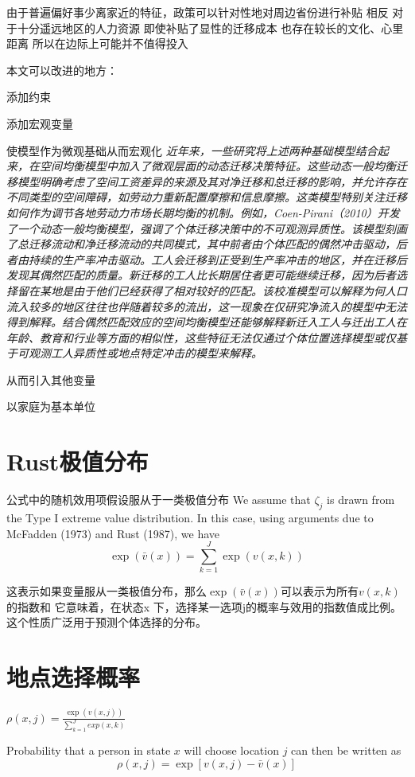 \documentclass[a4paper,12pt]{article}
\begin{document}
由于普遍偏好事少离家近的特征，政策可以针对性地对周边省份进行补贴
相反 对于十分遥远地区的人力资源 即使补贴了显性的迁移成本 也存在较长的文化、心里距离 所以在边际上可能并不值得投入



本文可以改进的地方：

添加约束

添加宏观变量

使模型作为微观基础从而宏观化
\textit{近年来，一些研究将上述两种基础模型结合起来，在空间均衡模型中加入了微观层面的动态迁移决策特征。这些动态一般均衡迁移模型明确考虑了空间工资差异的来源及其对净迁移和总迁移的影响，并允许存在不同类型的空间障碍，如劳动力重新配置摩擦和信息摩擦。这类模型特别关注迁移如何作为调节各地劳动力市场长期均衡的机制。例如，Coen-Pirani（2010）开发了一个动态一般均衡模型，强调了个体迁移决策中的不可观测异质性。该模型刻画了总迁移流动和净迁移流动的共同模式，其中前者由个体匹配的偶然冲击驱动，后者由持续的生产率冲击驱动。工人会迁移到正受到生产率冲击的地区，并在迁移后发现其偶然匹配的质量。新迁移的工人比长期居住者更可能继续迁移，因为后者选择留在某地是由于他们已经获得了相对较好的匹配。该校准模型可以解释为何人口流入较多的地区往往也伴随着较多的流出，这一现象在仅研究净流入的模型中无法得到解释。结合偶然匹配效应的空间均衡模型还能够解释新迁入工人与迁出工人在年龄、教育和行业等方面的相似性，这些特征无法仅通过个体位置选择模型或仅基于可观测工人异质性或地点特定冲击的模型来解释。}

从而引入其他变量

以家庭为基本单位


\newpage
\appendix
\section{Rust极值分布}
公式中的随机效用项假设服从于一类极值分布
We assume that $\zeta_j$ is drawn from the Type I extreme value distribution. In this case, using arguments due to McFadden (1973) and Rust (1987), we have
$$\exp\left(\bar{v}(x)\right) = \sum_{k=1}^J \exp\left(v(x, k)\right)$$

这表示如果变量服从一类极值分布，那么$\exp\left(\bar{v}(x)\right)$可以表示为所有$v(x, k)$的指数和
它意味着，在状态x 下，选择某一选项j的概率与效用的指数值成比例。
这个性质广泛用于预测个体选择的分布。

\section{地点选择概率}
$\rho(x,j)=\frac{\exp(v(x,j))}{\sum\limits_{k=1}^{J} exp(x,k)}$

Probability that a person in state $x$ will choose location $j$ can then be written as
$$\rho(x,j)=\exp[v(x,j)-\bar v(x)]$$



\newpage


\end{document}
